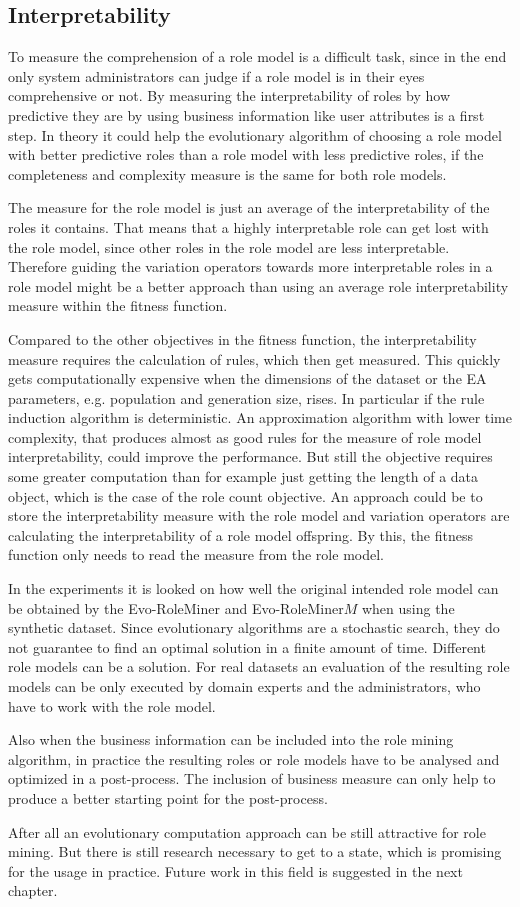 \subsection*{Interpretability}
	To measure the comprehension of a role model is a difficult task, since in the end only system administrators can judge if a role model is in their eyes comprehensive or not. By measuring the interpretability of roles by how predictive they are by using business information like user attributes is a first step. In theory it could help the evolutionary algorithm of choosing a role model with better predictive roles than a role model with less predictive roles, if the completeness and complexity measure is the same for both role models. 	
	
	The measure for the role model is just an average of the interpretability of the roles it contains. That means that a highly interpretable role can get lost with the role model, since other roles in the role model are less interpretable. Therefore guiding the variation operators towards more interpretable roles in a role model might be a better approach than using an average role interpretability measure within the fitness function.
	
	Compared to the other objectives in the fitness function, the interpretability measure requires the calculation of rules, which then get measured. This quickly gets computationally expensive when the dimensions of the dataset or the EA parameters, e.g. population and generation size, rises. In particular if the rule induction algorithm is deterministic. An approximation algorithm with lower time complexity, that produces almost as good rules for the measure of role model interpretability, could improve the performance. But still the objective requires some greater computation than for example just getting the length of a data object, which is the case of the role count objective. An approach could be to store the interpretability measure with the role model and variation operators are calculating the interpretability of a role model offspring. By this, the fitness function only needs to read the measure from the role model.
	
	In the experiments it is looked on how well the original intended role model can be obtained by the Evo-RoleMiner and Evo-RoleMiner$M$ when using the synthetic dataset. Since evolutionary algorithms are a stochastic search, they do not guarantee to find an optimal solution in a finite amount of time. Different role models can be a solution. For real datasets an evaluation of the resulting role models can be only executed by domain experts and the administrators, who have to work with the role model.
	
	Also when the business information can be included into the role mining algorithm, in practice the resulting roles or role models have to be analysed and optimized in a post-process. The inclusion of business measure can only help to produce a better starting point for the post-process.

\hfill \break
After all an evolutionary computation approach can be still attractive for role mining. But there is still research necessary to get to a state, which is promising for the usage in practice. Future work in this field is suggested in the next chapter.